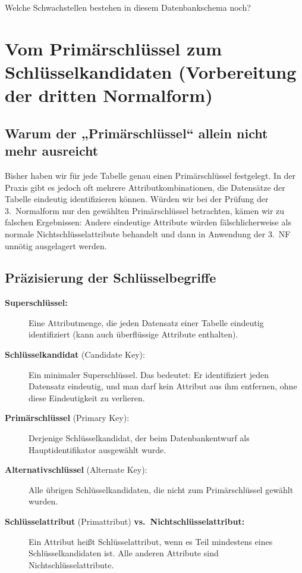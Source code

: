 Welche Schwachstellen bestehen in diesem Datenbankschema noch?

\section{Vom Primärschlüssel zum Schlüsselkandidaten (Vorbereitung der dritten Normalform)}

\subsection{Warum der „Primärschlüssel“ allein nicht mehr ausreicht}

Bisher haben wir für jede Tabelle genau einen Primärschlüssel festgelegt. In 
der Praxis gibt es jedoch oft mehrere Attributkombinationen, die Datensätze 
der Tabelle eindeutig identifizieren können. Würden wir bei der Prüfung der 
3.~Normalform nur den gewählten Primärschlüssel betrachten, kämen wir zu 
falschen Ergebnissen: Andere eindeutige Attribute würden fälschlicherweise 
als normale Nichtschlüsselattribute behandelt und dann in Anwendung der 
3.~NF unnötig ausgelagert werden.

\subsection{Präzisierung der Schlüsselbegriffe}

\begin{description}
\item[\textbf{Superschlüssel:}] Eine Attributmenge, die jeden Datensatz einer Tabelle 
eindeutig identifiziert (kann auch überflüssige Attribute enthalten).
\item[\textbf{Schlüsselkandidat} (Candidate Key):] Ein minimaler Superschlüssel. Das 
bedeutet: Er identifiziert jeden Datensatz eindeutig, und man darf kein 
Attribut aus ihm entfernen, ohne diese Eindeutigkeit zu verlieren.
\item[\textbf{Primärschlüssel} (Primary Key):] Derjenige Schlüsselkandidat, der beim 
Datenbankentwurf als Hauptidentifikator ausgewählt wurde.
\item[\textbf{Alternativschlüssel} (Alternate Key):] Alle übrigen Schlüsselkandidaten, 
die nicht zum Primärschlüssel gewählt wurden.
\item[\textbf{Schlüsselattribut} (Primattribut) \textbf{vs.\ Nichtschlüsselattribut:}] Ein 
Attribut heißt Schlüsselattribut, wenn es Teil mindestens eines 
Schlüsselkandidaten ist. Alle anderen Attribute sind Nichtschlüsselattribute.
\end{description}

